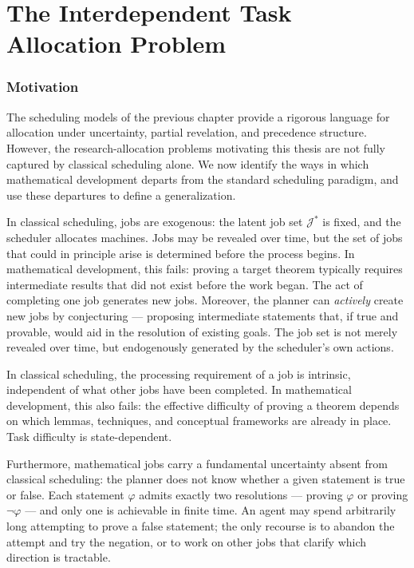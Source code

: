 \chapter{The Interdependent Task Allocation Problem}\label{chap:itap}

\subsection{Motivation}

The scheduling models of the previous chapter provide a rigorous language for
allocation under uncertainty, partial revelation, and precedence structure. However,
the research-allocation problems motivating this thesis are not fully captured by
classical scheduling alone. We now identify the ways in which mathematical development
departs from the standard scheduling paradigm, and use these departures to define a
generalization.

In classical scheduling, jobs are exogenous: the latent job set $\mathcal{J}^*$ is
fixed, and the scheduler allocates machines. Jobs may be revealed over time, but the
set of jobs that could in principle arise is determined before the process begins. In
mathematical development, this fails: proving a target theorem typically requires
intermediate results that did not exist before the work began. The act of completing
one job generates new jobs. Moreover, the planner can \emph{actively} create new jobs
by conjecturing --- proposing intermediate statements that, if true and provable,
would aid in the resolution of existing goals. The job set is not merely revealed over
time, but endogenously generated by the scheduler's own actions.

In classical scheduling, the processing requirement of a job is intrinsic, independent
of what other jobs have been completed. In mathematical development, this also fails:
the effective difficulty of proving a theorem depends on which lemmas, techniques, and
conceptual frameworks are already in place. Task difficulty is state-dependent.

Furthermore, mathematical jobs carry a fundamental uncertainty absent from classical
scheduling: the planner does not know whether a given statement is true or false. Each
statement $\varphi$ admits exactly two resolutions --- proving $\varphi$ or proving
$\neg\varphi$ --- and only one is achievable in finite time. An agent may spend
arbitrarily long attempting to prove a false statement; the only recourse is to
abandon the attempt and try the negation, or to work on other jobs that clarify which
direction is tractable.

